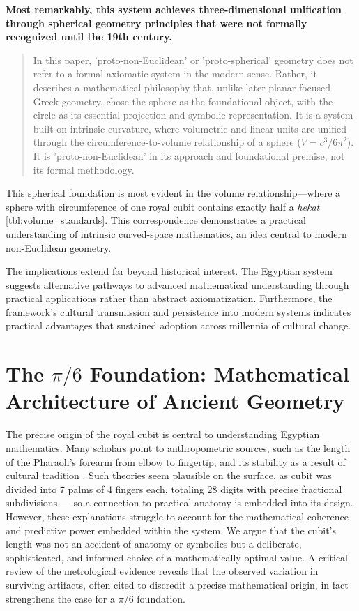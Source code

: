 \documentclass[11pt]{article}
\begin{document}
\textbf{Most remarkably, this system achieves three-dimensional unification through spherical geometry principles that were not formally recognized until the 19th century.}
\begin{quote}
In this paper, 'proto-non-Euclidean' or 'proto-spherical' geometry does not refer to a formal axiomatic system in the modern sense. Rather, it describes a mathematical philosophy that, unlike later planar-focused Greek geometry, chose the sphere as the foundational object, with the circle as its essential projection and symbolic representation. It is a system built on intrinsic curvature, where volumetric and linear units are unified through the circumference-to-volume relationship of a sphere ($V = c^3/6\pi^2$). It is 'proto-non-Euclidean' in its approach and foundational premise, not its formal methodology.
\end{quote}

This spherical foundation is most evident in the volume relationship—where a sphere with circumference of one royal cubit contains exactly half a \textit{hekat} \ref{tbl:volume_standards}. This correspondence demonstrates a practical understanding of intrinsic curved-space mathematics, an idea central to modern non-Euclidean geometry.

The implications extend far beyond historical interest. The Egyptian system suggests alternative pathways to advanced mathematical understanding through practical applications rather than abstract axiomatization. Furthermore, the framework's cultural transmission and persistence into modern systems indicates practical advantages that sustained adoption across millennia of cultural change.

\section{The \texorpdfstring{$\pi/6$}{pi/6} Foundation: Mathematical Architecture of Ancient Geometry}

The precise origin of the royal cubit is central to understanding Egyptian mathematics. Many scholars point to anthropometric sources, such as the length of the Pharaoh's forearm from elbow to fingertip, and its stability as a result of cultural tradition \cite{stone2014cubit, imhausen2016mathematics}. Such theories seem plausible on the surface, as cubit was divided into 7 palms of 4 fingers each, totaling 28 digits with precise fractional subdivisions — so a connection to practical anatomy is embedded into its design. However, these explanations struggle to account for the mathematical coherence and predictive power embedded within the system. We argue that the cubit's length was not an accident of anatomy or symbolics but a deliberate, sophisticated, and informed choice of a mathematically optimal value. A critical review of the metrological evidence reveals that the observed variation in surviving artifacts, often cited to discredit a precise mathematical origin, in fact strengthens the case for a $\pi/6$ foundation.
\end{document}
